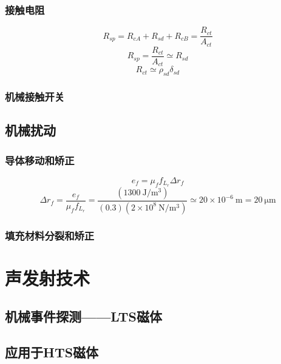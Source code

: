 \subsubsection*{接触电阻}
\begin{equation}%
R_{sp}=R_{cA}+R_{sd}+R_{cB} 
=\frac{R_{ct}}{A_{ct}}
\end{equation}
\begin{equation}%
R_{sp}=\frac{R_{ct}}{A_{ct}}\simeq R_{sd}
\end{equation}
\begin{equation}%
R_{ct}\simeq\rho_{sd}\delta_{sd}
\end{equation}


\subsubsection*{机械接触开关}

\subsection{机械扰动}

\subsubsection*{导体移动和矫正}
\begin{equation}%
e_f=\mu_ff_{L_r}\Delta r_f
\end{equation}
\begin{equation}%
\Delta r_f=\frac{e_f}{\mu_ff_{L_r}}=\frac{(1300\ \mathrm{J/m^3})}{(0.3)(2\times 10^8\ \mathrm{N/m^3})}\simeq 20\times 10^{-6}\ \mathrm{m}=20\ \mathrm{\mu m}
\end{equation}


\subsubsection*{填充材料分裂和矫正}

\section{声发射技术}
\subsection{机械事件探测——LTS磁体}

\subsection{应用于HTS磁体}




